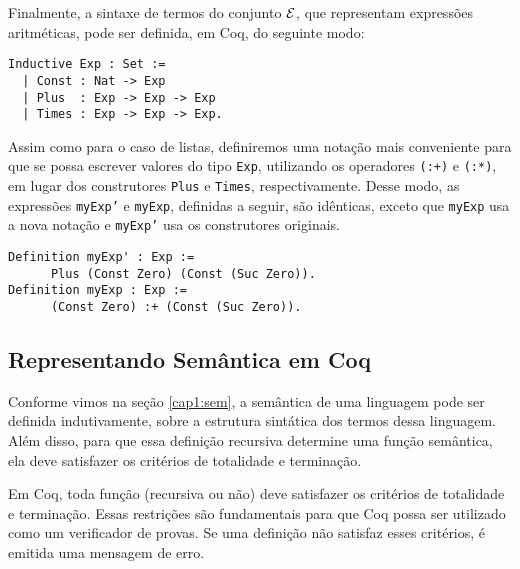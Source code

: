 Finalmente, a  sintaxe de termos do conjunto $\mathcal{E}$, que representam express\~oes aritm\'eticas, pode ser definida, em Coq, do seguinte modo:
\begin{lstlisting}
Inductive Exp : Set :=
  | Const : Nat -> Exp
  | Plus  : Exp -> Exp -> Exp
  | Times : Exp -> Exp -> Exp.
\end{lstlisting}


Assim como para o caso de listas, definiremos uma notação mais conveniente para que se possa escrever valores do tipo \texttt{Exp}, utilizando os operadores \texttt{(:+)} e \texttt{(:*)}, em lugar dos construtores \texttt{Plus} e \texttt{Times}, respectivamente. Desse modo, as expressões \texttt{myExp'} e \texttt{myExp}, definidas a seguir, são idênticas, exceto que \texttt{myExp} usa a nova notação e \texttt{myExp'} usa os construtores originais.
\begin{lstlisting}
Definition myExp' : Exp :=
      Plus (Const Zero) (Const (Suc Zero)).
Definition myExp : Exp :=
      (Const Zero) :+ (Const (Suc Zero)).
\end{lstlisting}

\subsection{Representando Sem\^antica em Coq}

Conforme vimos na se\c{c}\~ao \ref{cap1:sem}, a sem\^antica de uma linguagem pode ser definida indutivamente, sobre a estrutura sint\'atica dos termos dessa linguagem. Além disso, para que essa defini\c{c}\~ao recursiva determine uma fun\c{c}\~ao semântica, ela deve satisfazer os crit\'erios de totalidade e termina\c{c}\~ao.

Em Coq, toda fun\c{c}\~ao (recursiva ou n\~ao) deve satisfazer os crit\'erios de totalidade e termina\c{c}\~ao. Essas restri\c{c}\~oes s\~ao fundamentais para que Coq possa ser
utilizado como um verificador de provas. Se uma defini\c{c}\~ao n\~ao satisfaz  esses crit\'erios, é emitida uma mensagem de erro.

